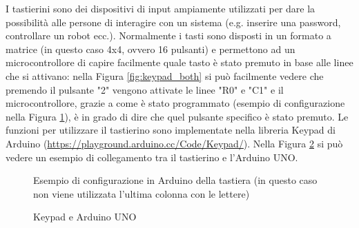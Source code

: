 \documentclass[12pt]{report}
\begin{document}
I tastierini sono dei dispositivi di input ampiamente utilizzati per dare la possibilità alle persone di interagire con un sistema (e.g. inserire una password, controllare un robot ecc.). Normalmente i tasti sono disposti in un formato a matrice (in questo caso 4x4, ovvero 16 pulsanti) e permettono ad un microcontrollore di capire facilmente quale tasto è stato premuto in base alle linee che si attivano: nella Figura \ref{fig:keypad_both} si può facilmente vedere che premendo il pulsante "2" vengono attivate le linee "R0" e "C1" e il microcontrollore, grazie a come è stato programmato (esempio di configurazione nella Figura \ref{fig:keypad_config}), è in grado di dire che quel pulsante specifico è stato premuto. Le funzioni per utilizzare il tastierino sono implementate nella libreria Keypad di Arduino (\url{https://playground.arduino.cc/Code/Keypad/}). Nella Figura \ref{fig:keypad_uno} si può vedere un esempio di collegamento tra il tastierino e l'Arduino UNO.


\begin{figure}
	\caption{Esempio di configurazione in Arduino della tastiera (in questo caso non viene utilizzata l'ultima colonna con le lettere)}
	\label{fig:keypad_config}
\end{figure}

\begin{figure}
	\caption{Keypad e Arduino UNO}
	\label{fig:keypad_uno}
\end{figure}
\end{document}
